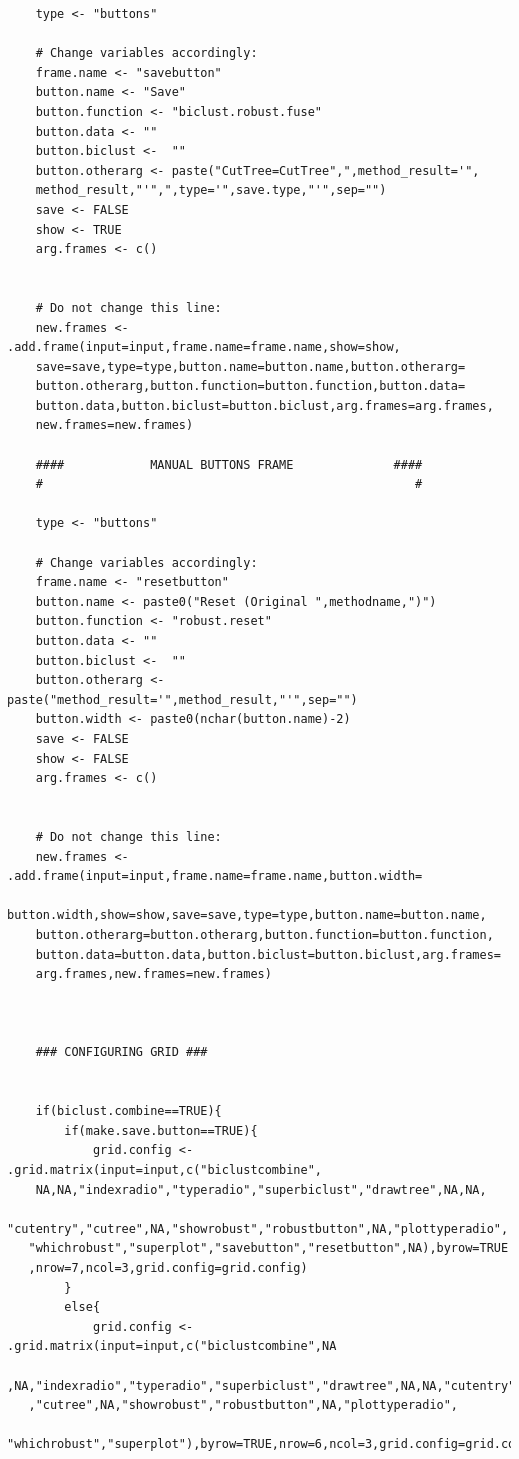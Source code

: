 \documentclass[a4paper]{article}\usepackage[]{graphicx}\usepackage[]{color}
\begin{document}
\begin{verbatim}
	type <- "buttons"
	
	# Change variables accordingly:
	frame.name <- "savebutton"  
	button.name <- "Save"  
	button.function <- "biclust.robust.fuse" 
	button.data <- "" 
	button.biclust <-  ""
	button.otherarg <- paste("CutTree=CutTree",",method_result='",
    method_result,"'",",type='",save.type,"'",sep="")
	save <- FALSE
	show <- TRUE
	arg.frames <- c() 
	
	
	# Do not change this line:
	new.frames <- .add.frame(input=input,frame.name=frame.name,show=show,
    save=save,type=type,button.name=button.name,button.otherarg=
    button.otherarg,button.function=button.function,button.data=
    button.data,button.biclust=button.biclust,arg.frames=arg.frames,
    new.frames=new.frames)
	
	####	    	MANUAL BUTTONS FRAME 			  ####
	#                               					 #
	
	type <- "buttons"
	
	# Change variables accordingly:
	frame.name <- "resetbutton"  
	button.name <- paste0("Reset (Original ",methodname,")")  
	button.function <- "robust.reset" 
	button.data <- "" 
	button.biclust <-  ""
	button.otherarg <-  paste("method_result='",method_result,"'",sep="")
	button.width <- paste0(nchar(button.name)-2)
	save <- FALSE
	show <- FALSE
	arg.frames <- c() 
	
	
	# Do not change this line:
	new.frames <- .add.frame(input=input,frame.name=frame.name,button.width=
    button.width,show=show,save=save,type=type,button.name=button.name,
    button.otherarg=button.otherarg,button.function=button.function,
    button.data=button.data,button.biclust=button.biclust,arg.frames=
    arg.frames,new.frames=new.frames)
	
		
	
	### CONFIGURING GRID ###
	
	
	if(biclust.combine==TRUE){
		if(make.save.button==TRUE){
			grid.config <- .grid.matrix(input=input,c("biclustcombine",
    NA,NA,"indexradio","typeradio","superbiclust","drawtree",NA,NA,
   "cutentry","cutree",NA,"showrobust","robustbutton",NA,"plottyperadio",
   "whichrobust","superplot","savebutton","resetbutton",NA),byrow=TRUE
   ,nrow=7,ncol=3,grid.config=grid.config)
		}
		else{
			grid.config <- .grid.matrix(input=input,c("biclustcombine",NA
   ,NA,"indexradio","typeradio","superbiclust","drawtree",NA,NA,"cutentry"
   ,"cutree",NA,"showrobust","robustbutton",NA,"plottyperadio",
   "whichrobust","superplot"),byrow=TRUE,nrow=6,ncol=3,grid.config=grid.config)
			

\end{verbatim}
\end{document}
